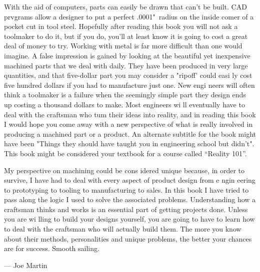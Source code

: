 With the aid of computers, parts can easily be drawn that can't be built. CAD
prvgrams allow a designer to put a perfect .0001"\ radius on the inside comer of
a pocket cut in tool steel. Hopefully after reading this book you will not ask a
toolmaker to do it, but if you do, you'll at least know it is going to cost a
great deal of money to try. Working with metal is far more difficult than one
would imagine. A false impression is gained by looking at the beautiful yet
inexpensive machined parts that we deal with daily. They have been produced in
very large quantities, and that five-dollar part you may consider a "ripoff'
could easi ly cost five hundred dollars if you had to manufacture just one. New
engi neers will often think a toolmaker is a failure when the seemingly simple
part they design ends up costing a thousand dollars to make. Most engineers wi
ll eventually have to deal with the craftsman who tum their ideas into reality,
and in reading this book I would hope you come away with a new perspective of
what is really involved in producing a machined part or a product. An alternate
subtitle for the book might have been "Things they should have taught you in
engineering school but didn't". This book might be considered your textbook for
a course called ``Reality 101''.


My perspective on machining could be cons idered unique because, in order to
survive, I have had to deal with every aspect of product design from e ngin
eering to prototyping to tooling to manufacturing to sales. In this book I have
tried to pass along the logic I used to solve the associated problems.
Understanding how a craftsman thinks and works is an essential part of getting
projects done. Unless you are wi lling to build your designs yourself, you are
going to have to learn how to deal with the craftsman who will actually build
them. The more you know about their methods, personalities and unique problems,
the better your chances are for success. Smooth sailing.

\bigskip
--- Joe Martin

\secup
\secup
